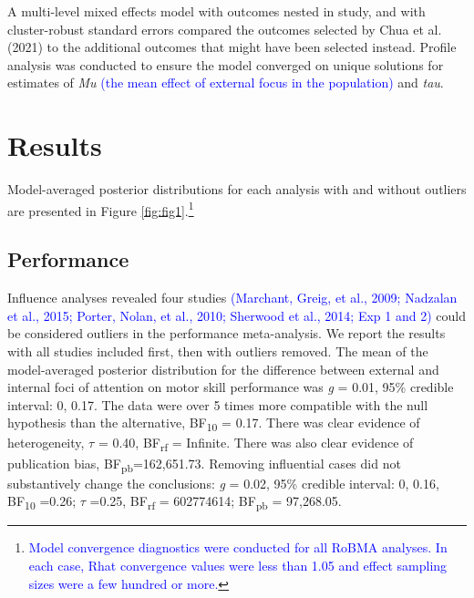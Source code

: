 \documentclass[
  man, donotrepeattitle,floatsintext]{apa7}
\begin{document}
A multi-level mixed effects model with outcomes nested in study, and with cluster-robust standard errors compared the outcomes selected by Chua et al. (2021) to the additional outcomes that might have been selected instead. Profile analysis was conducted to ensure the model converged on unique solutions for estimates of \emph{Mu} \textcolor{blue}{(the mean effect of external focus in the population)} and \emph{tau}.

\hypertarget{results}{%
\section{Results}\label{results}}

Model-averaged posterior distributions for each analysis with and without outliers are presented in Figure \ref{fig:fig1}.\footnote{\textcolor{blue}{Model convergence diagnostics were conducted for all RoBMA analyses. In each case, Rhat convergence values were less than 1.05 and effect sampling sizes were a few hundred or more.}}

\hypertarget{performance}{%
\subsection{Performance}\label{performance}}

Influence analyses revealed four studies \textcolor{blue}{(Marchant, Greig, et al., 2009; Nadzalan et al., 2015; Porter, Nolan, et al., 2010; Sherwood et al., 2014; Exp 1 and 2)} could be considered outliers in the performance meta-analysis. We report the results with all studies included first, then with outliers removed. The mean of the model-averaged posterior distribution for the difference between external and internal foci of attention on motor skill performance was \emph{g} = 0.01, 95\% credible interval: 0, 0.17. The data were over 5 times more compatible with the null hypothesis than the alternative, BF\textsubscript{10} = 0.17. There was clear evidence of heterogeneity, \(\tau\) = 0.40, BF\textsubscript{rf} = Infinite. There was also clear evidence of publication bias, BF\textsubscript{pb}=162,651.73. Removing influential cases did not substantively change the conclusions: \emph{g} = 0.02, 95\% credible interval: 0, 0.16, BF\textsubscript{10} =0.26; \(\tau\) =0.25, BF\textsubscript{rf} = 602774614; BF\textsubscript{pb} = 97,268.05.

\clearpage
\end{document}
